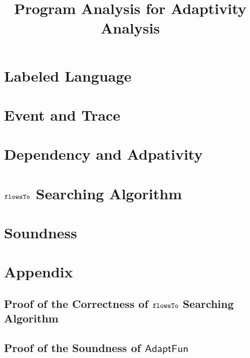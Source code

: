 \documentclass[a4paper,11pt]{article}
\newcommand{\THESYSTEM}{\textsf{AdaptFun}}
\begin{document}
\title{Program Analysis for Adaptivity Analysis}

\author{}

\date{}

\maketitle
%
% 
\section{Labeled Language}

\clearpage
\section{Event and Trace}


\clearpage
\section{Dependency and Adpativity}


% 
\clearpage
% 

\clearpage
\section{$\mathtt{flowsTo}$ Searching Algorithm}


\section{Soundness}

\clearpage
%
\section*{Appendix}
\subsection{Proof of the Correctness of $\mathtt{flowsTo}$ Searching Algorithm}

\subsection{Proof of the Soundness of $\THESYSTEM$}
% 



\end{document}
